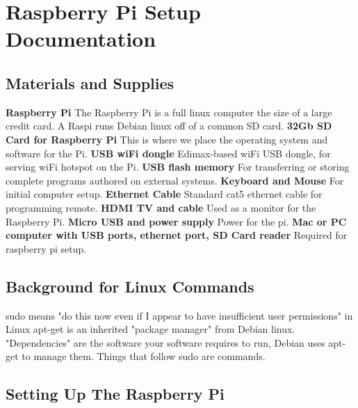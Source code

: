 
\chapter{Raspberry Pi Setup Documentation} %

\label{AppendixD} %


 
\section{Materials and Supplies}
\textbf{Raspberry Pi}
The Raspberry Pi is a full linux computer the size of a large credit card. A Raspi runs Debian linux off of a common SD card.
\textbf{32Gb SD Card for Raspberry Pi}
This is where we place the operating system and software for the Pi.
\textbf{USB wiFi dongle}
Edimax-based wiFi USB dongle, for serving wiFi hotspot on the Pi.
\textbf{USB flash memory}
For transferring or storing complete programs authored on external systems.
\textbf{Keyboard and Mouse}
For initial computer setup.
\textbf{Ethernet Cable}
Standard cat5 ethernet cable for programming remote.
\textbf{HDMI TV and cable}
Used as a monitor for the Raspberry Pi.
\textbf{Micro USB and power supply}
Power for the pi.
\textbf{Mac or PC computer with USB ports, ethernet port, SD Card reader}
Required for raspberry pi setup.

\section{Background for Linux Commands}
sudo means "do this now even if I appear to have insufficient user permissions" in Linux 
apt-get is an inherited "package manager" from Debian linux. "Dependencies" are the software your software requires to run, Debian uses apt-get to manage them.
Things that follow sudo are commands.

\section{Setting Up The Raspberry Pi}
